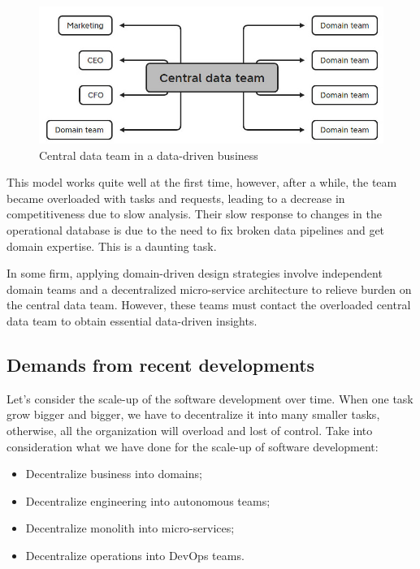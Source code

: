 \documentclass[12pt, a4paper]{book}
\begin{document}
\begin{figure}[ht]
	\begin{framed}
		\centering
		\includegraphics[width=14cm]{CentralDataTeam.jpg}
		\caption{Central data team in a data-driven business}
		\label{centraldata}
	\end{framed}
\end{figure}

This model works quite well at the first time, however, after a while, the team became overloaded with tasks and requests, leading to a decrease in competitiveness due to slow analysis. Their slow response to changes in the operational database is due to the need to fix broken data pipelines and get domain expertise. This is a daunting task. \cite{datamesh2022prologue,datameshweb}

In some firm, applying domain-driven design strategies involve independent domain teams and a decentralized micro-service architecture to relieve burden on the central data team. However, these teams must contact the overloaded central data team to obtain essential data-driven insights. \cite{datamesh2022prologue}

\subsection{Demands from recent developments}
Let's consider the scale-up of the software development over time. When one task grow bigger and bigger, we have to decentralize it into many smaller tasks, otherwise, all the organization will overload and lost of control. Take into consideration what we have done for the scale-up of software development:
	\begin{itemize}[nosep]
		\item Decentralize business into domains;
		\item Decentralize engineering into autonomous teams;
		\item Decentralize monolith into micro-services;
		\item Decentralize operations into DevOps teams.
	\end{itemize}
\end{document}
